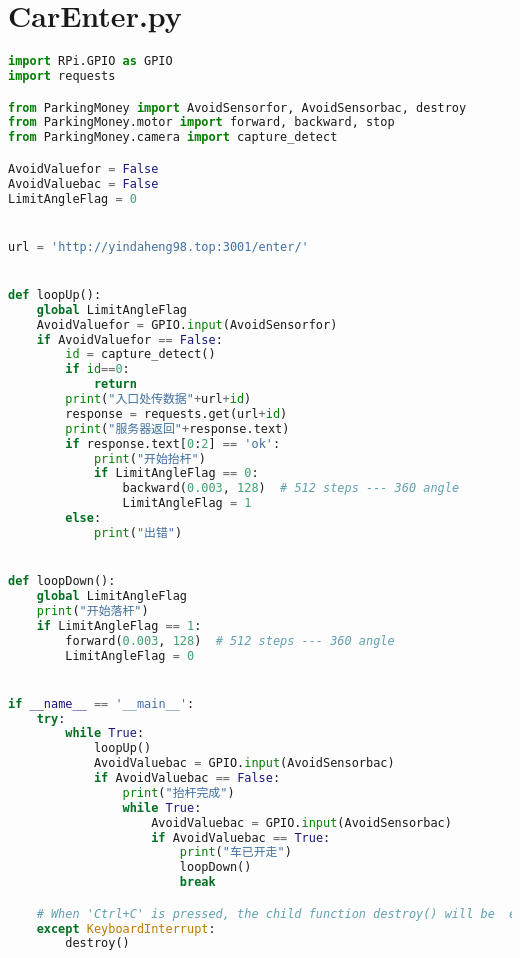 \section{CarEnter.py}\label{apdx:CarEnter.py}
\begin{lstlisting}[language=python]
import RPi.GPIO as GPIO
import requests

from ParkingMoney import AvoidSensorfor, AvoidSensorbac, destroy
from ParkingMoney.motor import forward, backward, stop
from ParkingMoney.camera import capture_detect

AvoidValuefor = False
AvoidValuebac = False
LimitAngleFlag = 0


url = 'http://yindaheng98.top:3001/enter/'


def loopUp():
    global LimitAngleFlag
    AvoidValuefor = GPIO.input(AvoidSensorfor)
    if AvoidValuefor == False:
        id = capture_detect()
        if id==0:
            return
        print("入口处传数据"+url+id)
        response = requests.get(url+id)
        print("服务器返回"+response.text)
        if response.text[0:2] == 'ok':
            print("开始抬杆")
            if LimitAngleFlag == 0:
                backward(0.003, 128)  # 512 steps --- 360 angle
                LimitAngleFlag = 1
        else:
            print("出错")


def loopDown():
    global LimitAngleFlag
    print("开始落杆")
    if LimitAngleFlag == 1:
        forward(0.003, 128)  # 512 steps --- 360 angle
        LimitAngleFlag = 0


if __name__ == '__main__':
    try:
        while True:
            loopUp()
            AvoidValuebac = GPIO.input(AvoidSensorbac)
            if AvoidValuebac == False:
                print("抬杆完成")
                while True:
                    AvoidValuebac = GPIO.input(AvoidSensorbac)
                    if AvoidValuebac == True:
                        print("车已开走")
                        loopDown()
                        break

    # When 'Ctrl+C' is pressed, the child function destroy() will be  executed.
    except KeyboardInterrupt:
        destroy()
\end{lstlisting}


